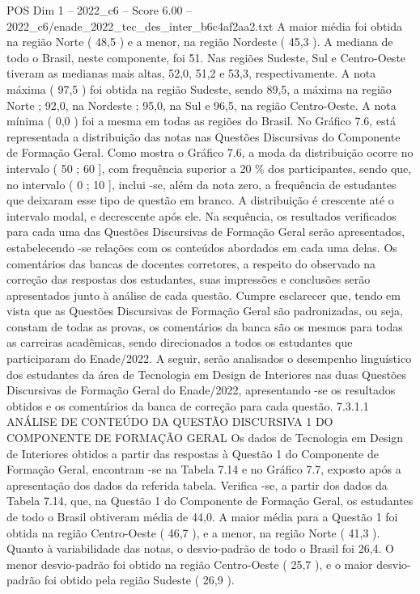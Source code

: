 \begin{textsample}{POS Dim 1 – 2022\_c6 – Score 6.00 – 2022\_c6/enade\_2022\_tec\_des\_inter\_b6c4af2aa2.txt}
A maior média foi obtida na região Norte ( 48,5 ) e a menor, na região Nordeste ( 45,3 ).
A mediana de todo o Brasil, neste componente, foi 51.
Nas regiões Sudeste, Sul e Centro-Oeste tiveram as medianas mais altas, 52,0, 51,2 e 53,3, respectivamente.
A nota máxima ( 97,5 ) foi obtida na região Sudeste, sendo 89,5, a máxima na região Norte ; 92,0, na Nordeste ; 95,0, na Sul e 96,5, na região Centro-Oeste.
A nota mínima ( 0,0 ) foi a mesma em todas as regiões do Brasil.
No Gráfico 7.6, está representada a distribuição das notas nas Questões Discursivas do Componente de Formação Geral.
Como mostra o Gráfico 7.6, a moda da distribuição ocorre no intervalo ( 50 ; 60 ], com frequência superior a 20 \% dos participantes, sendo que, no intervalo ( 0 ; 10 ], inclui -se, além da nota zero, a frequência de estudantes que deixaram esse tipo de questão em branco.
A distribuição é crescente até o intervalo modal, e decrescente após ele.
Na sequência, os resultados verificados para cada uma das Questões Discursivas de Formação Geral serão apresentados, estabelecendo -se relações com os conteúdos abordados em cada uma delas.
Os comentários das bancas de docentes corretores, a respeito do observado na correção das respostas dos estudantes, suas impressões e conclusões serão apresentados junto à análise de cada questão.
Cumpre esclarecer que, tendo em vista que as Questões Discursivas de Formação Geral são padronizadas, ou seja, constam de todas as provas, os comentários da banca são os mesmos para todas as carreiras acadêmicas, sendo direcionados a todos os estudantes que participaram do Enade/2022.
A seguir, serão analisados o desempenho linguístico dos estudantes da área de Tecnologia em Design de Interiores nas duas Questões Discursivas de Formação Geral do Enade/2022, apresentando -se os resultados obtidos e os comentários da banca de correção para cada questão. 7.3.1.1 ANÁLISE DE CONTEÚDO DA QUESTÃO DISCURSIVA 1 DO COMPONENTE DE FORMAÇÃO GERAL Os dados de Tecnologia em Design de Interiores obtidos a partir das respostas à Questão 1 do Componente de Formação Geral, encontram -se na Tabela 7.14 e no Gráfico 7.7, exposto após a apresentação dos dados da referida tabela.
Verifica -se, a partir dos dados da Tabela 7.14, que, na Questão 1 do Componente de Formação Geral, os estudantes de todo o Brasil obtiveram média de 44,0.
A maior média para a Questão 1 foi obtida na região Centro-Oeste ( 46,7 ), e a menor, na região Norte ( 41,3 ).
Quanto à variabilidade das notas, o desvio-padrão de todo o Brasil foi 26,4.
O menor desvio-padrão foi obtido na região Centro-Oeste ( 25,7 ), e o maior desvio-padrão foi obtido pela região Sudeste ( 26,9 ).

\end{textsample}
